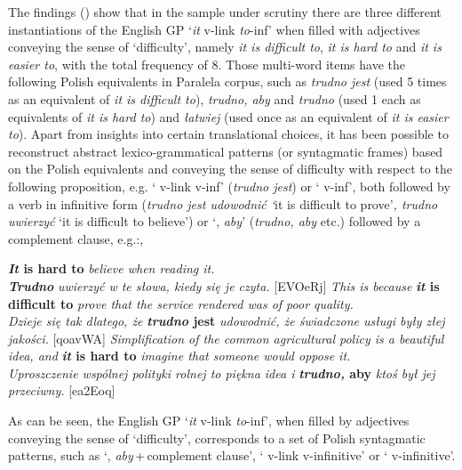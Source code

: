 \documentclass[output=paper]{langscibook}
\begin{document}
The findings () show that in the sample under scrutiny there are three different instantiations of the English GP ‘\textit{it} v-link {\ADJ} \textit{to}{}-inf’ when filled with adjectives conveying the sense of ‘difficulty’, namely \textit{it is difficult to}, \textit{it is hard to} and \textit{it is easier to}, with the total frequency of 8. Those multi-word items have the following Polish equivalents in Paralela corpus, such as \textit{trudno jest} (used 5 times as an equivalent of \textit{it is difficult to}), \textit{trudno, aby} and \textit{trudno} (used 1 each as equivalents of \textit{it is hard to}) and \textit{łatwiej} (used once as an equivalent of \textit{it is easier to}). Apart from insights into certain translational choices, it has been possible to reconstruct abstract lexico-grammatical patterns (or syntagmatic frames) based on the Polish equivalents and conveying the sense of difficulty with respect to the following proposition, e.g. ‘{\ADV} v-link v-inf’ (\textit{trudno jest}) or ‘{\ADV} v-inf’, both followed by a verb in infinitive form (\textit{trudno jest udowodnić ‘}it is difficult to prove’\textit{, trudno uwierzyć} ‘it is difficult to believe’) or ‘{\ADV}, \textit{aby}’ (\textit{trudno, aby} etc.) followed by a complement clause, e.g.:,

\ea
\ea \textbf{\textit{It} \textbf{is} \textbf{hard} \textbf{to}} \textit{believe when reading it.}\\
\textbf{\textit{Trudno} }\textit{uwierzyć w te słowa, kiedy się je czyta.} [EVOeRj]
\ex \textit{This is because} \textbf{\textit{it} \textbf{is} \textbf{difficult} \textbf{to}} \textit{prove that the service rendered was of poor quality.}\\
\textit{Dzieje się tak dlatego, że} \textbf{\textit{trudno} \textbf{jest}} \textit{udowodnić, że świadczone usługi były złej jakości.} [qoavWA]
\ex \textit{Simplification of the common agricultural policy is a beautiful idea, and} \textbf{\textit{it} \textbf{is} \textbf{hard} \textbf{to}} \textit{imagine that someone would oppose it.}\\ 
\textit{Uproszczenie wspólnej polityki rolnej to piękna idea i} \textbf{\textit{trudno,} \textbf{aby}} \textit{ktoś był jej przeciwny.} [ea2Eoq]
\z
\z

As can be seen, the English GP ‘\textit{it} v-link {\ADJ} \textit{to}{}-inf’, when filled by adjectives conveying the sense of ‘difficulty’, corresponds to a set of Polish syntagmatic patterns, such as ‘{\ADV}, \textit{aby}\,+\,complement clause’, ‘{\ADV} v-link v-infinitive’ or ‘{\ADV} v-infinitive’.
\end{document}
